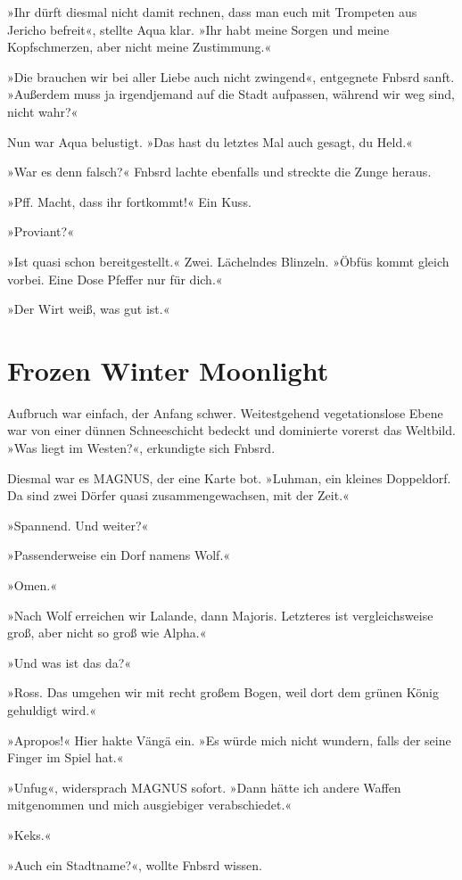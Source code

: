 »Ihr dürft diesmal nicht damit rechnen, dass man euch mit Trompeten aus Jericho befreit«, stellte Aqua klar. »Ihr habt meine Sorgen und meine Kopfschmerzen, aber nicht meine Zustimmung.«

»Die brauchen wir bei aller Liebe auch nicht zwingend«, entgegnete Fnbsrd sanft. »Außerdem muss ja irgendjemand auf die Stadt aufpassen, während wir weg sind, nicht wahr?«

Nun war Aqua belustigt. »Das hast du letztes Mal auch gesagt, du Held.«

»War es denn falsch?« Fnbsrd lachte ebenfalls und streckte die Zunge heraus.

»Pff. Macht, dass ihr fortkommt!« Ein Kuss.

»Proviant?«

»Ist quasi schon bereitgestellt.« Zwei. Lächelndes Blinzeln. »Öbfüs kommt gleich vorbei. Eine Dose Pfeffer nur für dich.«

»Der Wirt weiß, was gut ist.«


\chapter{Frozen Winter Moonlight}

Aufbruch war einfach, der Anfang schwer. Weitestgehend vegetationslose Ebene war von einer dünnen Schneeschicht bedeckt und dominierte vorerst das Weltbild. »Was liegt im Westen?«, erkundigte sich Fnbsrd.

Diesmal war es MAGNUS, der eine Karte bot. »Luhman, ein kleines Doppeldorf. Da sind zwei Dörfer quasi zusammengewachsen, mit der Zeit.«

»Spannend. Und weiter?«

»Passenderweise ein Dorf namens Wolf.«

»Omen.«

»Nach Wolf erreichen wir Lalande, dann Majoris. Letzteres ist vergleichsweise groß, aber nicht so groß wie Alpha.«

»Und was ist das da?«

»Ross. Das umgehen wir mit recht großem Bogen, weil dort dem grünen König gehuldigt wird.«

»Apropos!« Hier hakte Vängä ein. »Es würde mich nicht wundern, falls der seine Finger im Spiel hat.«

»Unfug«, widersprach MAGNUS sofort. »Dann hätte ich andere Waffen mitgenommen und mich ausgiebiger verabschiedet.«

»Keks.«

»Auch ein Stadtname?«, wollte Fnbsrd wissen.

